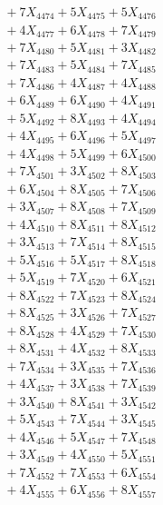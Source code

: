 \documentclass[a4paper,10pt]{article}
\begin{document}
{\begin{align}
&\;  + 7 X_{4474} + 5 X_{4475} + 5 X_{4476} \\[0.3ex]
&\;  + 4 X_{4477} + 6 X_{4478} + 7 X_{4479} \\[0.5ex]\allowbreak
&\;  + 7 X_{4480} + 5 X_{4481} + 3 X_{4482} \\[0.3ex]
&\;  + 7 X_{4483} + 5 X_{4484} + 7 X_{4485} \\[0.3ex]
&\;  + 7 X_{4486} + 4 X_{4487} + 4 X_{4488} \\[0.3ex]
&\;  + 6 X_{4489} + 6 X_{4490} + 4 X_{4491} \\[0.3ex]
&\;  + 5 X_{4492} + 8 X_{4493} + 4 X_{4494} \\[0.3ex]
&\;  + 4 X_{4495} + 6 X_{4496} + 5 X_{4497} \\[0.3ex]
&\;  + 4 X_{4498} + 5 X_{4499} + 6 X_{4500} \\[0.3ex]
&\;  + 7 X_{4501} + 3 X_{4502} + 8 X_{4503} \\[0.3ex]
&\;  + 6 X_{4504} + 8 X_{4505} + 7 X_{4506} \\[0.3ex]
&\;  + 3 X_{4507} + 8 X_{4508} + 7 X_{4509} \\[0.5ex]\allowbreak
&\;  + 4 X_{4510} + 8 X_{4511} + 8 X_{4512} \\[0.3ex]
&\;  + 3 X_{4513} + 7 X_{4514} + 8 X_{4515} \\[0.3ex]
&\;  + 5 X_{4516} + 5 X_{4517} + 8 X_{4518} \\[0.3ex]
&\;  + 5 X_{4519} + 7 X_{4520} + 6 X_{4521} \\[0.3ex]
&\;  + 8 X_{4522} + 7 X_{4523} + 8 X_{4524} \\[0.3ex]
&\;  + 8 X_{4525} + 3 X_{4526} + 7 X_{4527} \\[0.3ex]
&\;  + 8 X_{4528} + 4 X_{4529} + 7 X_{4530} \\[0.3ex]
&\;  + 8 X_{4531} + 4 X_{4532} + 8 X_{4533} \\[0.3ex]
&\;  + 7 X_{4534} + 3 X_{4535} + 7 X_{4536} \\[0.3ex]
&\;  + 4 X_{4537} + 3 X_{4538} + 7 X_{4539} \\[0.5ex]\allowbreak
&\;  + 3 X_{4540} + 8 X_{4541} + 3 X_{4542} \\[0.3ex]
&\;  + 5 X_{4543} + 7 X_{4544} + 3 X_{4545} \\[0.3ex]
&\;  + 4 X_{4546} + 5 X_{4547} + 7 X_{4548} \\[0.3ex]
&\;  + 3 X_{4549} + 4 X_{4550} + 5 X_{4551} \\[0.3ex]
&\;  + 7 X_{4552} + 7 X_{4553} + 6 X_{4554} \\[0.3ex]
&\;  + 4 X_{4555} + 6 X_{4556} + 8 X_{4557} \\[0.3ex]

\end{align}}
\end{document}
